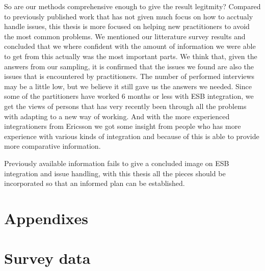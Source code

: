 \documentclass{llncs}
\begin{document}
So are our methods comprehensive enough to give the result legitmity? Compared to previously published work that has not given much focus on how to acctualy handle issues, this thesis is more focused on helping new practitioners to avoid the most common problems.
We mentioned our litterature survey results and concluded that we where confident with the amount of information we were able to get from this actually was the most important parts. We think that, given the answers from our sampling, it is confirmed that the issues we found are also the issues that is encountered by practitioners.
The number of performed interviews may be a little low, but we believe it still gave us the answers we needed. Since some of the partitioners have worked 6 months or less with ESB integration, we get the views of persons that has very recently been through all the problems with adapting to a new way of working. And with the more experienced integrationers from Ericsson we got some insight from people who has more experience with various kinds of integration and because of this is able to provide more comparative information.

Previously available information fails to give a concluded image on ESB integration and issue handling, with this thesis all the pieces should be incorporated so that an informed plan can be established.

\newpage



\newpage
\section*{Appendixes}
\appendix
\section{Survey data}
\end{document}
